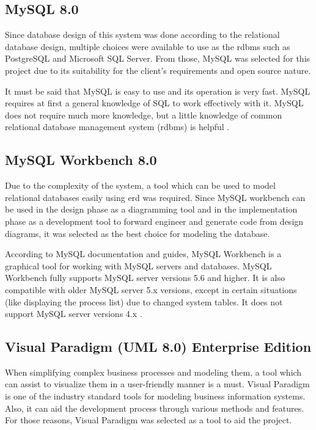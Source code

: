 \documentclass[12pt]{report}
\begin{document}
\subsection{MySQL 8.0}
Since database design of this system was done according to the relational database design, multiple choices were available to use as the \acrlong{rdbms} such as PostgreSQL and Microsoft SQL Server. From those, MySQL was selected for this project due to its suitability for the client's requirements and open source nature.

It must be said that MySQL is easy to use and its operation is very fast. MySQL requires at
first a general knowledge of SQL to work effectively with it. MySQL does not require much
more knowledge, but a little knowledge of common relational database management
system (\acrshort{rdbms}) is helpful \cite{vanier_2019_advanced}.

\subsection{MySQL Workbench 8.0}
Due to the complexity of the system, a tool which can be used to model relational databases easily using \acrshort{erd} was required. Since MySQL workbench can be used in the design phase as a diagramming tool and in the implementation phase as a development tool to forward engineer and generate code from design diagrams, it was selected as the best choice for modeling the database.

According to MySQL documentation and guides, MySQL Workbench is a graphical tool for working with MySQL servers and databases. MySQL Workbench fully supports MySQL server versions 5.6 and higher. It is also compatible with older MySQL server 5.x versions, except in certain situations (like displaying the process list) due to changed system tables. It does not support MySQL server versions 4.x \cite{mclaughlin_2013_mysql}.

\subsection{Visual Paradigm (UML 8.0) Enterprise Edition}
When simplifying complex business processes and modeling them, a tool which can assist to visualize them in a user-friendly manner is a must. Visual Paradigm is one of the industry standard tools for modeling business information systems. Also, it can aid the development process through various methods and features. For those reasons, Visual Paradigm was selected as a tool to aid the project.
\end{document}
